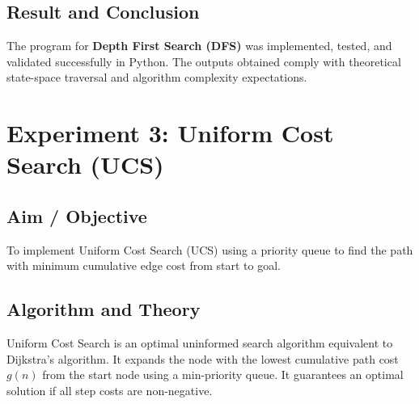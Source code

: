 \documentclass[11pt,a4paper]{report}
\begin{document}
\section{Result and Conclusion}
The program for \textbf{Depth First Search (DFS)} was implemented, tested, and validated successfully in Python. The outputs obtained comply with theoretical state-space traversal and algorithm complexity expectations.

\newpage

\chapter{Experiment 3: Uniform Cost Search (UCS)}

\section{Aim / Objective}
To implement Uniform Cost Search (UCS) using a priority queue to find the path with minimum cumulative edge cost from start to goal.

\section{Algorithm and Theory}
Uniform Cost Search is an optimal uninformed search algorithm equivalent to Dijkstra's algorithm. It expands the node with the lowest cumulative path cost $g(n)$ from the start node using a min-priority queue. It guarantees an optimal solution if all step costs are non-negative.
\end{document}
